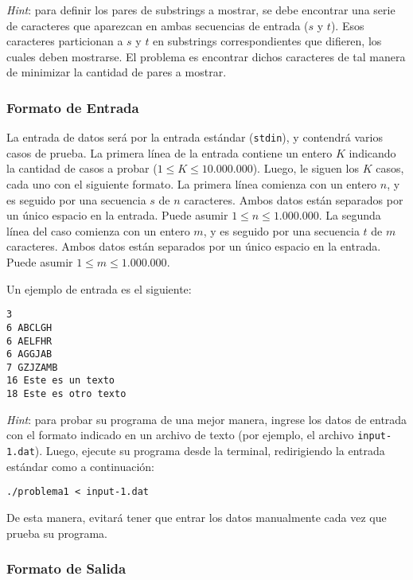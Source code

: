 \medskip

\noindent
\emph{Hint}: para definir los pares de substrings a mostrar, se debe encontrar una serie de caracteres que aparezcan en ambas secuencias de entrada ($s$ y $t$). Esos caracteres particionan a $s$ y $t$ en substrings correspondientes que difieren, los cuales deben mostrarse. El problema es encontrar dichos caracteres de tal manera de minimizar la cantidad de pares a mostrar.



\subsubsection{Formato de Entrada}

La entrada de datos será por la entrada estándar (\texttt{stdin}), y contendrá varios casos de prueba. La primera línea de la entrada contiene un entero $K$ indicando la cantidad de casos a probar ($1 \le K \le 10.000.000$).
Luego, le siguen los $K$ casos, cada uno con el siguiente formato.
La primera línea comienza con un entero $n$, y es seguido por una secuencia $s$ de $n$ caracteres. Ambos datos están separados por un único espacio en la entrada. Puede asumir $1 \le n \le 1.000.000$.
La segunda línea del caso comienza con un entero $m$, y es seguido por una secuencia $t$ de $m$ caracteres. Ambos datos están separados por un único espacio en la entrada. Puede asumir $1 \le m \le 1.000.000$.

Un ejemplo de entrada es el siguiente:
\begin{verbatim}
3
6 ABCLGH 
6 AELFHR
6 AGGJAB
7 GZJZAMB
16 Este es un texto 
18 Este es otro texto
\end{verbatim}

\noindent
\textit{Hint}: para probar su programa de una mejor manera, ingrese los datos de entrada
con el formato indicado en un archivo de texto (por ejemplo, el archivo \texttt{input-1.dat}).
Luego, ejecute su programa desde la terminal, redirigiendo la entrada estándar como a continuación: 
\begin{verbatim}
./problema1 < input-1.dat
\end{verbatim}
De esta manera, evitará tener que entrar los datos manualmente cada vez que prueba su programa.





\subsubsection{Formato de Salida}

